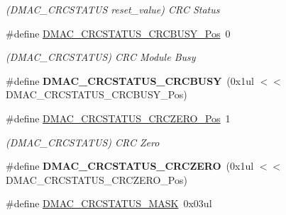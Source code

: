 \begin{DoxyCompactItemize}
\begin{DoxyCompactList}\small\item\em (D\+M\+A\+C\+\_\+\+C\+R\+C\+S\+T\+A\+T\+U\+S reset\+\_\+value) C\+R\+C Status \end{DoxyCompactList}\item 
\hypertarget{group___s_a_m_l21___d_m_a_c_gae6bb7fca62508d8dd9b0b0ad51ca6503}{}\#define \hyperlink{group___s_a_m_l21___d_m_a_c_gae6bb7fca62508d8dd9b0b0ad51ca6503}{D\+M\+A\+C\+\_\+\+C\+R\+C\+S\+T\+A\+T\+U\+S\+\_\+\+C\+R\+C\+B\+U\+S\+Y\+\_\+\+Pos}~0\label{group___s_a_m_l21___d_m_a_c_gae6bb7fca62508d8dd9b0b0ad51ca6503}

\begin{DoxyCompactList}\small\item\em (D\+M\+A\+C\+\_\+\+C\+R\+C\+S\+T\+A\+T\+U\+S) C\+R\+C Module Busy \end{DoxyCompactList}\item 
\hypertarget{group___s_a_m_l21___d_m_a_c_gaf93b4ba437e8219c5b5ee859e20607ed}{}\#define {\bfseries D\+M\+A\+C\+\_\+\+C\+R\+C\+S\+T\+A\+T\+U\+S\+\_\+\+C\+R\+C\+B\+U\+S\+Y}~(0x1ul $<$$<$ D\+M\+A\+C\+\_\+\+C\+R\+C\+S\+T\+A\+T\+U\+S\+\_\+\+C\+R\+C\+B\+U\+S\+Y\+\_\+\+Pos)\label{group___s_a_m_l21___d_m_a_c_gaf93b4ba437e8219c5b5ee859e20607ed}

\item 
\hypertarget{group___s_a_m_l21___d_m_a_c_ga82828623d891f8488dd3afc780ec46fd}{}\#define \hyperlink{group___s_a_m_l21___d_m_a_c_ga82828623d891f8488dd3afc780ec46fd}{D\+M\+A\+C\+\_\+\+C\+R\+C\+S\+T\+A\+T\+U\+S\+\_\+\+C\+R\+C\+Z\+E\+R\+O\+\_\+\+Pos}~1\label{group___s_a_m_l21___d_m_a_c_ga82828623d891f8488dd3afc780ec46fd}

\begin{DoxyCompactList}\small\item\em (D\+M\+A\+C\+\_\+\+C\+R\+C\+S\+T\+A\+T\+U\+S) C\+R\+C Zero \end{DoxyCompactList}\item 
\hypertarget{group___s_a_m_l21___d_m_a_c_gabcda07f7f0242bf4225159bce302b804}{}\#define {\bfseries D\+M\+A\+C\+\_\+\+C\+R\+C\+S\+T\+A\+T\+U\+S\+\_\+\+C\+R\+C\+Z\+E\+R\+O}~(0x1ul $<$$<$ D\+M\+A\+C\+\_\+\+C\+R\+C\+S\+T\+A\+T\+U\+S\+\_\+\+C\+R\+C\+Z\+E\+R\+O\+\_\+\+Pos)\label{group___s_a_m_l21___d_m_a_c_gabcda07f7f0242bf4225159bce302b804}

\item 
\hypertarget{group___s_a_m_l21___d_m_a_c_gad4ddc72d73a4566323014d93fce2f081}{}\#define \hyperlink{group___s_a_m_l21___d_m_a_c_gad4ddc72d73a4566323014d93fce2f081}{D\+M\+A\+C\+\_\+\+C\+R\+C\+S\+T\+A\+T\+U\+S\+\_\+\+M\+A\+S\+K}~0x03ul\label{group___s_a_m_l21___d_m_a_c_gad4ddc72d73a4566323014d93fce2f081}


\end{DoxyCompactItemize}
